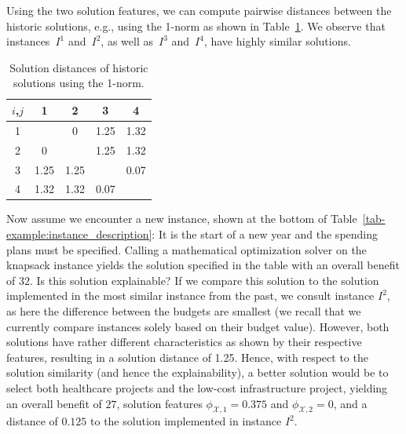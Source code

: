 \documentclass[11pt, a4paper]{article}
\begin{document}
Using the two solution features, we can compute pairwise distances between the historic solutions, e.g., using the 1-norm as shown in Table~\ref{tab-example:solution features distance}. We observe that instances~$I^1$ and~$I^2$, as well as~$I^3$ and~$I^4$, have highly similar solutions.\\

\begin{table}[htbp]
	\centering
	\caption{Solution distances of historic solutions using the 1-norm. %
		\label{tab-example:solution features distance}}
	\begin{tabular}{c||c|c|c|c}
		$i$,$j$ & 1 & 2 & 3 & 4 \\
		\hline\hline
		1 & & 0 & 1.25 & 1.32\\
		\hline
		2 & 0 &  & 1.25 & 1.32 \\
		\hline
		3 & 1.25 & 1.25 & & 0.07\\
		\hline
		4 & 1.32 & 1.32 & 0.07 &
	\end{tabular}
\end{table}


Now assume we encounter a new instance, shown at the bottom of Table~\ref{tab-example:instance_description}: It is the start of a new year and the spending plans must be specified. Calling a mathematical optimization solver on the knapsack instance yields the solution specified in the table with an overall benefit of $32$. Is this solution explainable? If we compare this solution to the solution implemented in the most similar instance from the past, we consult instance $I^2$, as here the difference between the budgets are smallest (we recall that we currently compare instances solely based on their budget value). However, both solutions have rather different characteristics as shown by their respective features, resulting in a solution distance of 1.25. Hence, with respect to the solution similarity (and hence the explainability), a better solution would be to select both healthcare projects and the low-cost infrastructure project, yielding an overall benefit of $27$, solution features $\phi_{\mathcal{X},1}=0.375$ and $\phi_{\mathcal{X},2}=0$, and a distance of $0.125$ to the solution implemented in instance $I^2$.

\end{document}
